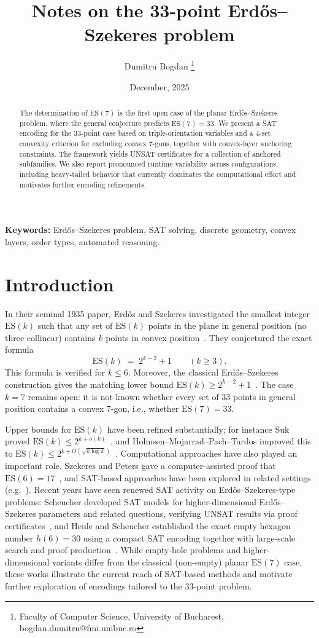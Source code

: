 \documentclass[11pt,a4paper]{article}
\title{Notes on the 33-point Erd\H{o}s--Szekeres problem}
\author{Dumitru Bogdan
\thanks{Faculty of Computer Science, University of Bucharest, bogdan.dumitru@fmi.unibuc.ro}}
\date{December, 2025}
\theoremstyle{definition}
\newcommand{\ES}{\mathrm{ES}}
\begin{document}
\maketitle

\begin{abstract}
The determination of $\ES(7)$ is the first open case of the planar Erd\H{o}s--Szekeres problem, where the general conjecture predicts $\ES(7)=33$.
We present a SAT encoding for the 33-point case based on triple-orientation variables and a 4-set convexity criterion for excluding convex $7$-gons, together with convex-layer anchoring constraints.
The framework yields UNSAT certificates for a collection of anchored subfamilies. We also report pronounced runtime variability across configurations, including heavy-tailed behavior that currently dominates the computational effort and motivates further encoding refinements.
\end{abstract}

\noindent\textbf{Keywords:} Erd\H{o}s--Szekeres problem, SAT solving, discrete geometry, convex layers, order types, automated reasoning.

\section{Introduction}

In their seminal 1935 paper, Erd\H{o}s and Szekeres investigated the smallest integer $\ES(k)$ such that any set of $\ES(k)$ points in the plane in general position (no three collinear) contains $k$ points in convex position~\cite{Erdos1935}. They conjectured the exact formula
\[
\ES(k) \;=\; 2^{k-2}+1 \qquad (k\ge 3).
\]
This formula is verified for $k\le 6$. Moreover, the classical Erd\H{o}s--Szekeres construction gives the matching lower bound $\ES(k)\ge 2^{k-2}+1$~\cite{Erdos1935}. The case $k=7$ remains open: it is not known whether every set of $33$ points in general position contains a convex $7$-gon, i.e., whether $\ES(7)=33$.

Upper bounds for $\ES(k)$ have been refined substantially; for instance Suk proved $\ES(k)\le 2^{k+o(k)}$~\cite{Suk16}, and Holmsen--Mojarrad--Pach--Tardos improved this to $\ES(k)\le 2^{k+O(\sqrt{k\log k})}$~\cite{holmsen2020extensions}. Computational approaches have also played an important role. Szekeres and Peters gave a computer-assisted proof that $\ES(6)=17$~\cite{Szekeres2006}, and SAT-based approaches have been explored in related settings (e.g.\ \cite{Balko2017,Mari2017}). Recent years have seen renewed SAT activity on Erd\H{o}s--Szekeres-type problems: Scheucher developed SAT models for higher-dimensional Erd\H{o}s--Szekeres parameters and related questions, verifying UNSAT results via proof certificates~\cite{Scheucher2023}, and Heule and Scheucher established the exact empty hexagon number $h(6)=30$ using a compact SAT encoding together with large-scale search and proof production~\cite{HeuleScheucher2024}. While empty-hole problems and higher-dimensional variants differ from the classical (non-empty) planar $\ES(7)$ case, these works illustrate the current reach of SAT-based methods and motivate further exploration of encodings tailored to the 33-point problem.
\end{document}
